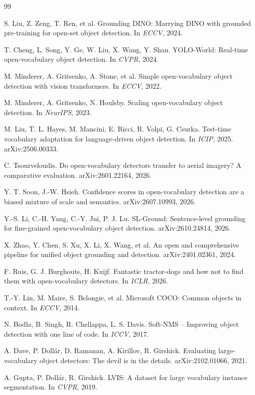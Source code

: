 \documentclass[10pt,twocolumn,letterpaper]{article}
\begin{document}
{\small
\begin{thebibliography}{99}

 S. Liu, Z. Zeng, T. Ren, et al. Grounding DINO: Marrying DINO with grounded pre-training for open-set object detection. In \emph{ECCV}, 2024.

 T. Cheng, L. Song, Y. Ge, W. Liu, X. Wang, Y. Shan. YOLO-World: Real-time open-vocabulary object detection. In \emph{CVPR}, 2024.

 M. Minderer, A. Gritsenko, A. Stone, et al. Simple open-vocabulary object detection with vision transformers. In \emph{ECCV}, 2022.

 M. Minderer, A. Gritsenko, N. Houlsby. Scaling open-vocabulary object detection. In \emph{NeurIPS}, 2023.

 M. Liu, T. L. Hayes, M. Mancini, E. Ricci, R. Volpi, G. Csurka. Test-time vocabulary adaptation for language-driven object detection. In \emph{ICIP}, 2025. arXiv:2506.00333.

 C. Tsourveloudis. Do open-vocabulary detectors transfer to aerial imagery? A comparative evaluation. arXiv:2601.22164, 2026.

 Y. T. Soon, J.-W. Hsieh. Confidence scores in open-vocabulary detection are a biased mixture of scale and semantics. arXiv:2607.10993, 2026.

 Y.-S. Li, C.-H. Yang, C.-Y. Jui, P. J. Lu. SL-Ground: Sentence-level grounding for fine-grained open-vocabulary object detection. arXiv:2610.24814, 2026.

 X. Zhao, Y. Chen, S. Xu, X. Li, X. Wang, et al. An open and comprehensive pipeline for unified object grounding and detection. arXiv:2401.02361, 2024.

 F. Ruis, G. J. Burghouts, H. Kuijf. Fantastic tractor-dogs and how not to find them with open-vocabulary detectors. In \emph{ICLR}, 2026.

 T.-Y. Lin, M. Maire, S. Belongie, et al. Microsoft COCO: Common objects in context. In \emph{ECCV}, 2014.

 N. Bodla, B. Singh, R. Chellappa, L. S. Davis. Soft-NMS -- Improving object detection with one line of code. In \emph{ICCV}, 2017.

 A. Dave, P. Doll\'ar, D. Ramanan, A. Kirillov, R. Girshick. Evaluating large-vocabulary object detectors: The devil is in the details. arXiv:2102.01066, 2021.

 A. Gupta, P. Doll\'ar, R. Girshick. LVIS: A dataset for large vocabulary instance segmentation. In \emph{CVPR}, 2019.

\end{thebibliography}
}
\end{document}
